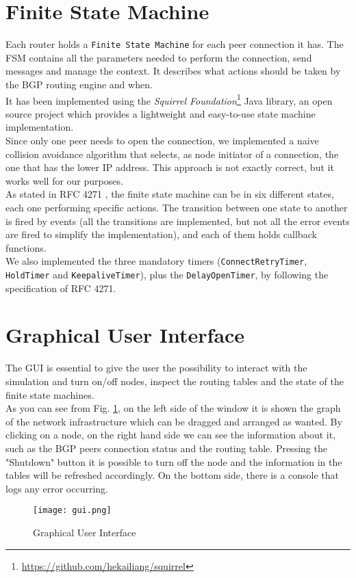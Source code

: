 \section{Finite State Machine}\label{fsm}
Each router holds a \texttt{Finite State Machine} for each peer connection it has. The FSM contains all the parameters needed to perform the connection, send messages and manage the context. It describes what actions should be taken by the BGP routing engine and when.\\
It has been implemented using the \textit{Squirrel Foundation}\footnote{\url{https://github.com/hekailiang/squirrel}} Java library, an open source project which provides a lightweight and easy-to-use state machine implementation.\\
Since only one peer needs to open the connection, we implemented a naive collision avoidance algorithm that selects, as node initiator of a connection, the one that has the lower IP address. This approach is not exactly correct, but it works well for our purposes.\\
As stated in RFC 4271 \cite{rfc4271}, the finite state machine can be in six different states, each one performing specific actions. The transition between one state to another is fired by events (all the transitions are implemented, but not all the error events are fired to simplify the implementation), and each of them holds callback functions.\\
We also implemented the three mandatory timers (\texttt{ConnectRetryTimer}, \texttt{HoldTimer} and \texttt{KeepaliveTimer}), plus the \texttt{DelayOpenTimer}, by following the specification of RFC 4271.

\section{Graphical User Interface}
The GUI is essential to give the user the possibility to interact with the simulation and turn on/off nodes, inspect the routing tables and the state of the finite state machines.\\
As you can see from Fig. \ref{fig:gui}, on the left side of the window it is shown the graph of the network infrastructure which can be dragged and arranged as wanted. By clicking on a node, on the right hand side we can see the information about it, such as the BGP peers connection status and the routing table. Pressing the "Shutdown" button it is possible to turn off the node and the information in the tables will be refreshed accordingly. 
On the bottom side, there is a console that logs any error occurring.
\begin{figure}[h]
    \centering
    \texttt{[image: gui.png]}
    \caption{Graphical User Interface}
    \label{fig:gui}
\end{figure}


